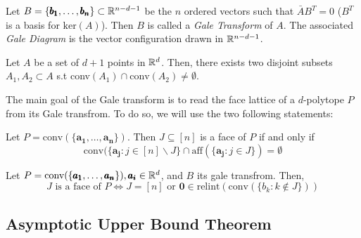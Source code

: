 \begin{definition}
    Let $B = \{ \pmb{b_1}, \dots, \pmb{b_n} \} \subset \mathbb{R}^{n -d -1}$ be the $n$ ordered vectors such that $\bar{A} B^T = 0$ ($B^T$ is a basis for $\text{ker}(A)$).
    Then $B$ is called a \textit{Gale Transform} of $A$.
    The associated \textit{Gale Diagram} is the vector configuration drawn in $\mathbb{R}^{n -d -1}$.
\end{definition}

\begin{lemma}
    Let $A$ be a set of $d+1$ points in $\mathbb{R}^d$. Then, there exists two disjoint subsets $A_1, A_2 \subset A$ s.t conv$(A_1) \cap \text{conv}(A_2) \neq \emptyset$.
\end{lemma}

The main goal of the Gale transform is to read the face lattice of a $d$-polytope $P$ from its Gale transfrom.
To do so, we will use the two following statements:

\begin{lemma}
    Let $P = \text{conv}(\{\pmb{a_1}, \dots, \pmb{a_n}\})$. Then $J \subseteq [n]$ is a face of $P$ if and only if
    $$\text{conv}(\{\pmb{a_j} : j \in [n] \backslash J \} \cap \text{aff}(\{\pmb{a_j} : j \in J \}) = \emptyset$$
\end{lemma}
\begin{theorem}
    Let $P = \text{conv}(\{\pmb{a_1}, \dots, \pmb{a_n}\}), \pmb{a_i} \in \mathbb{R}^{d}$, and $B$ its gale transfrom.
    Then,
    $$J \text{ is a face of } P \Leftrightarrow J = [n] \text{ or } \pmb{0} \in \text{relint}(\text{conv}(\{b_k : k \not\in J \}))$$
\end{theorem}

\subsection{Asymptotic Upper Bound Theorem}
